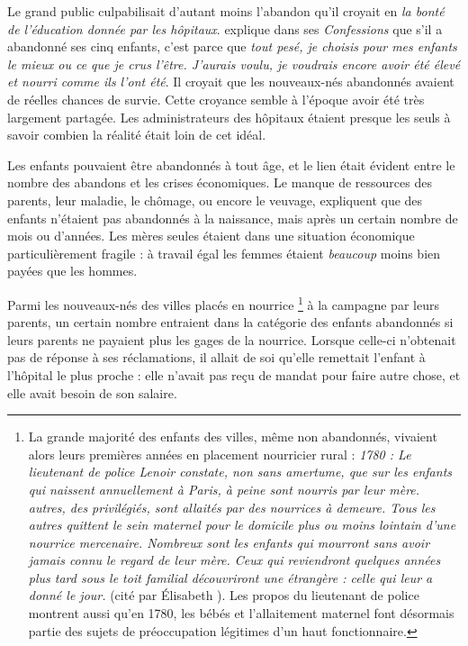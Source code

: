  Le grand public culpabilisait d'autant moins l'abandon qu'il croyait en \emph{la bonté de l'éducation donnée par les hôpitaux}.  explique dans ses \emph{Confessions} que s'il a abandonné ses cinq enfants, c'est parce que \emph{tout pesé, je choisis pour mes enfants le mieux ou ce que je crus l'être. J'aurais voulu, je voudrais encore avoir été élevé et nourri comme ils l'ont été}. Il croyait que les nouveaux-nés abandonnés avaient de réelles chances de survie. Cette croyance semble à l'époque avoir été très largement partagée. Les administrateurs des hôpitaux étaient presque les seuls à savoir combien la réalité était loin de cet idéal. 

 Les enfants pouvaient être abandonnés à tout âge, et le lien était évident entre le nombre des abandons et les crises économiques. Le manque de ressources des parents, leur maladie, le chômage, ou encore le veuvage, expliquent que des enfants n'étaient pas abandonnés à la naissance, mais après un certain nombre de mois ou d'années. Les mères seules étaient dans une situation économique particulièrement fragile : à travail égal les femmes étaient \emph{beaucoup} moins bien payées que les hommes. 



 Parmi les nouveaux-nés des villes placés en nourrice%
\footnote{La grande majorité des enfants des villes, même non abandonnés, vivaient alors leurs premières années en placement nourricier rural : \emph{1780 : Le lieutenant de police Lenoir constate, non sans amertume, que sur les  enfants qui naissent annuellement à Paris,  à peine sont nourris par leur mère.  autres, des privilégiés, sont allaités par des nourrices à demeure. Tous les autres quittent le sein maternel pour le domicile plus ou moins lointain d'une nourrice mercenaire. Nombreux sont les enfants qui mourront sans avoir jamais connu le regard de leur mère. Ceux qui reviendront quelques années plus tard sous le toit familial découvriront une étrangère : celle qui leur a donné le jour.} (cité par Élisabeth ). Les propos du lieutenant de police montrent aussi qu'en 1780, les bébés et l'allaitement maternel font désormais partie des sujets de préoccupation légitimes d'un haut fonctionnaire.} 
à la campagne par leurs parents, un certain nombre entraient dans la catégorie des enfants abandonnés si leurs parents ne payaient plus les gages de la nourrice. Lorsque celle-ci n'obtenait pas de réponse à ses réclamations, il allait de soi qu'elle remettait l'enfant à l'hôpital le plus proche : elle n'avait pas reçu de mandat pour faire autre chose, et elle avait besoin de son salaire. 

